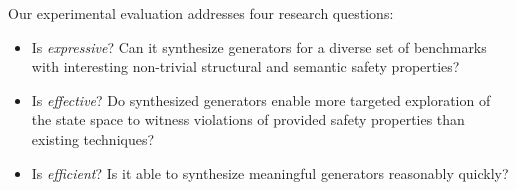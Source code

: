 
Our experimental evaluation addresses four research questions:
\begin{itemize}
\item[\textbf{Q1}:] Is \name{} \emph{expressive}? Can it synthesize
  generators for a diverse set of benchmarks with interesting
  non-trivial structural and semantic safety properties?
\item[\textbf{Q2}:] Is \name{} \emph{effective}? Do synthesized
  generators enable more targeted exploration of the state
  space to witness violations of provided safety properties than
  existing techniques?
\item[\textbf{Q3}:] Is \name{} \emph{efficient}? Is it able to
  synthesize meaningful generators reasonably quickly?
\end{itemize} %

